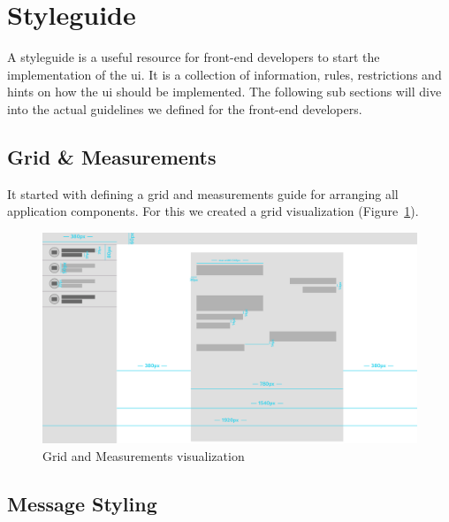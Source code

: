 \section{Styleguide}\label{sec:styleguide}
A styleguide is a useful resource for front-end developers to start the implementation of the \ac{ui}.
It is a collection of information, rules, restrictions and hints on how the \ac{ui} should be implemented.
The following sub sections will dive into the actual guidelines we defined for the front-end developers.

\subsection{Grid \& Measurements}\label{subsec:grid-and-measurements}

It started with defining a grid and measurements guide for arranging all application components. For this we created a
grid visualization (Figure~\ref{fig:grid}).

\begin{figure}[H]
    \centering
    \includegraphics[width=1.0\textwidth]{./graphics/grid}
    \caption{Grid and Measurements visualization}
    \label{fig:grid}
\end{figure}

\subsection{Message Styling}\label{subsec:message-styling}

